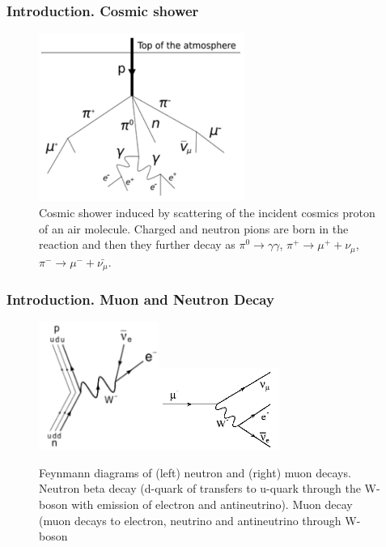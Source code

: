 \begin{frame}\frametitle{Introduction. Cosmic shower}
\begin{figure}
\caption{Cosmic shower induced by scattering of the incident cosmics proton of an air molecule. Charged and neutron pions are born in the reaction and then they further decay as $\pi^0 \rightarrow \gamma\gamma$, $\pi^+ \rightarrow \mu^+ + \nu_\mu$, $\pi^- \rightarrow \mu^- + \bar{\nu_\mu}$.}
\label{fig:cosmicMuons}
\centering
\includegraphics[width=0.60\textwidth, keepaspectratio=true]{figs/cosmicMuons.png}
\end{figure}
\end{frame}

\begin{frame}\frametitle{Introduction. Muon and Neutron Decay}
\scriptsize
\begin{figure}
\caption{Feynmann diagrams of (left) neutron and (right) muon decays. Neutron beta decay \cite{ref_fig_NeutronDecay}(d-quark of transfers to u-quark through the W-boson with emission of electron and antineutrino). Muon decay \cite{ref_fig_MuonDecay}(muon decays to electron, neutrino and antineutrino through W-boson}
\label{fig:MuonAndNeutronDecays}
\centering
\includegraphics[width=0.35\textwidth, keepaspectratio=true]{figs/NeutronBetaDecay.png}\includegraphics[width=0.35\textwidth, keepaspectratio=true]{figs/MuonDecay.png}
\end{figure}
\end{frame}

